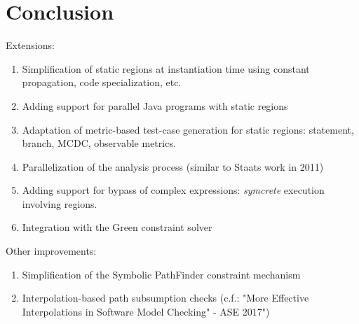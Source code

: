 \section{Conclusion}


Extensions: 
\begin{enumerate}
\item Simplification of static regions at instantiation time using constant propagation, code specialization, etc.

\item Adding support for parallel Java programs with static regions

\item Adaptation of metric-based test-case generation for static regions: statement, branch, MCDC, observable metrics.

\item Parallelization of the analysis process (similar to Staats work in 2011)

\item Adding support for bypass of complex expressions: {\em symcrete} execution involving regions.

\item Integration with the Green constraint solver

\end{enumerate}

Other improvements:
\begin{enumerate}
\item Simplification of the Symbolic PathFinder constraint mechanism

\item Interpolation-based path subsumption checks  (c.f.: "More Effective Interpolations in Software Model Checking" - ASE 2017")

\end{enumerate}


